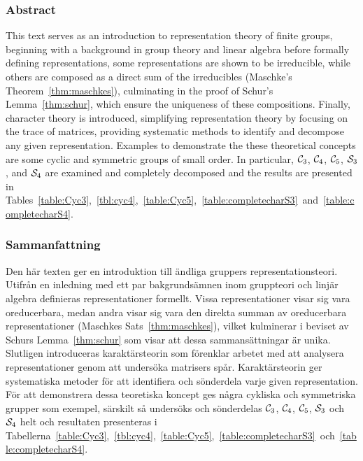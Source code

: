 \clearpage{\thispagestyle{empty}}
\begin{center}
	\subsubsection*{Abstract}
\end{center}

	This text serves as an introduction to representation theory of finite groups, beginning with a background in group theory and linear algebra before formally defining representations, some representations are shown to be irreducible, while others are composed as a direct sum of the irreducibles (Maschke's Theorem~\ref{thm:maschkes}), culminating in the proof of Schur's Lemma~\ref{thm:schur}, which ensure the uniqueness of these compositions. Finally, character theory is introduced, simplifying representation theory by focusing on the trace of matrices, providing systematic methods to identify and decompose any given representation. Examples to demonstrate the these theoretical concepts are some cyclic and symmetric groups of small order. In particular, $\mathcal{C}_3$, $\mathcal{C}_4$, $\mathcal{C}_5$, $\mathcal{S}_3$, and $\mathcal{S}_4$ are examined and completely decomposed and the results are presented in Tables~\ref{table:Cyc3},~\ref{tbl:cyc4},~\ref{table:Cyc5},~\ref{table:completecharS3}~and~\ref{table:completecharS4}.
		
\begin{center}
	\item\subsubsection*{Sammanfattning}
	
\end{center}

	Den här texten ger en introduktion till  ändliga gruppers representationsteori. Utifrån en inledning med ett par bakgrundsämnen inom gruppteori och linjär algebra definieras representationer formellt. Vissa representationer visar sig vara oreducerbara, medan andra visar sig vara den direkta summan av oreducerbara representationer (Maschkes Sats~\ref{thm:maschkes}), vilket kulminerar i beviset av  Schurs Lemma~\ref{thm:schur} som visar att dessa sammansättningar är unika. Slutligen introduceras karaktärsteorin som förenklar arbetet med att analysera representationer genom att undersöka matrisers spår. Karaktärsteorin ger systematiska metoder för att identifiera och sönderdela varje given representation. För att demonstrera dessa teoretiska koncept ges några cykliska och symmetriska grupper som exempel, särskilt så undersöks och sönderdelas $\mathcal{C}_3$, $\mathcal{C}_4$, $\mathcal{C}_5$, $\mathcal{S}_3$ och $\mathcal{S}_4$ helt och resultaten presenteras i Tabellerna~\ref{table:Cyc3},~\ref{tbl:cyc4},~\ref{table:Cyc5},~\ref{table:completecharS3}~och~\ref{table:completecharS4}.
	
